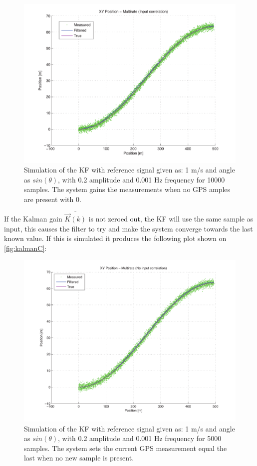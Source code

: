 \begin{figure}[htbp]
	\centering
	\includegraphics[width=\textwidth]{img/kalmanb}
	\caption{Simulation of the \ac{KF} with reference signal given as: 1 m/s and angle as $sin(\theta)$, with 0.2 amplitude and 0.001 Hz frequency for 10000 samples. The system gains the measurements when no \ac{GPS} amples are present with 0.}
	\label{fig:kalmanB}
\end{figure}

If the Kalman gain $\bar{\vec{K}(k)}$ is not zeroed out, the \ac{KF} will use the same sample as input, this causes the filter to try and make the system converge towards the last known value. If this is simulated it produces the following plot shown on \vref{fig:kalmanC}:

\begin{figure}[htbp]
	\centering
	\includegraphics[width=\textwidth]{img/kalmanc}
	\caption{Simulation of the \ac{KF} with reference signal given as: 1 m/s and angle as $sin(\theta)$, with 0.2 amplitude and 0.001 Hz frequency for 5000 samples. The system sets the current \ac{GPS} measurement equal the last when no new sample is present.}
	\label{fig:kalmanC}
\end{figure}

